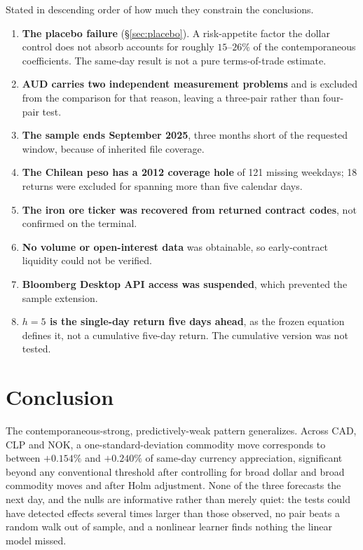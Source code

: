 \documentclass[11pt,a4paper]{article}
\begin{document}
Stated in descending order of how much they constrain the conclusions.

\begin{enumerate}\itemsep2pt
\item \textbf{The placebo failure} (\S\ref{sec:placebo}). A risk-appetite factor
the dollar control does not absorb accounts for roughly $15$--$26\%$ of the
contemporaneous coefficients. The same-day result is not a pure terms-of-trade
estimate.
\item \textbf{AUD carries two independent measurement problems} and is excluded
from the comparison for that reason, leaving a three-pair rather than four-pair
test.
\item \textbf{The sample ends September 2025}, three months short of the
requested window, because of inherited file coverage.
\item \textbf{The Chilean peso has a 2012 coverage hole} of 121 missing
weekdays; 18 returns were excluded for spanning more than five calendar days.
\item \textbf{The iron ore ticker was recovered from returned contract codes},
not confirmed on the terminal.
\item \textbf{No volume or open-interest data} was obtainable, so
early-contract liquidity could not be verified.
\item \textbf{Bloomberg Desktop API access was suspended}, which prevented the
sample extension.
\item \textbf{$h=5$ is the single-day return five days ahead}, as the frozen
equation defines it, not a cumulative five-day return. The cumulative version
was not tested.
\end{enumerate}

\section{Conclusion}

The contemporaneous-strong, predictively-weak pattern generalizes. Across CAD,
CLP and NOK, a one-standard-deviation commodity move corresponds to between
$+0.154\%$ and $+0.240\%$ of same-day currency appreciation, significant beyond
any conventional threshold after controlling for broad dollar and broad
commodity moves and after Holm adjustment. None of the three forecasts the next
day, and the nulls are informative rather than merely quiet: the tests could
have detected effects several times larger than those observed, no pair beats a
random walk out of sample, and a nonlinear learner finds nothing the linear
model missed.
\end{document}
